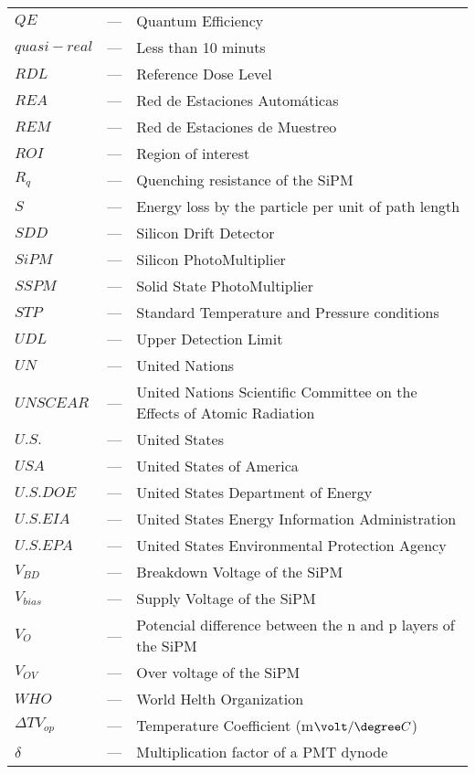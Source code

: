 \begin{longtable}{p{25mm} c p{120mm} }
$QE$ & --- & Quantum Efficiency\\
$quasi-real$ & --- & Less than 10 minuts\\
$RDL$ & --- & Reference Dose Level\\
$REA$ & --- & Red de Estaciones Automáticas\\
$REM$ & --- & Red de Estaciones de Muestreo\\
$ROI$ & --- & Region of interest\\
$R_q$ & --- & Quenching resistance of the SiPM\\
$S$ & --- & Energy loss by the particle per unit of path length\\
$SDD$ & --- & Silicon Drift Detector\\
$SiPM$ & --- & Silicon PhotoMultiplier\\
$SSPM$ & --- & Solid State PhotoMultiplier\\
$STP$ & --- & Standard Temperature and Pressure conditions\\
$UDL$ & --- & Upper Detection Limit\\
$UN$ & --- & United Nations\\
$UNSCEAR$ & --- & United Nations Scientific Committee on the Effects
\newline
of Atomic Radiation\\
$U.S.$ & --- & United States\\
$USA$ & --- & United States of America\\
$U.S. DOE$ & --- & United States Department of Energy\\
$U.S. EIA$ & --- & United States Energy Information Administration\\
$U.S. EPA$ & --- & United States Environmental Protection Agency\\
$V_{BD}$ & --- & Breakdown Voltage of the SiPM\\
$V_{bias}$ & --- & Supply Voltage of the SiPM\\
$V_{O}$ & --- & Potencial difference between the n and p layers of 
\newline
the SiPM\\
$V_{OV}$ & --- & Over voltage of the SiPM\\
$WHO$ & --- & World Helth Organization\\
$\Delta TV_{op}$ & --- & Temperature Coefficient (m$\volt/\degree C$)\\
$\delta$ & --- & Multiplication factor of a PMT dynode\\


\end{longtable}
